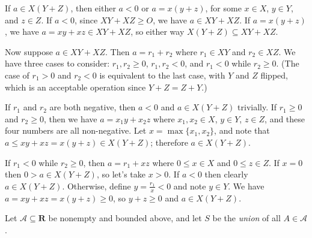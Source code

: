 \begin{solution}
{\item If \(a \in X(Y+Z)\), then either \(a < 0\) or \(a = x(y+z)\), for some \(x \in X\), \(y \in Y\), and \(z \in Z\). If \(a < 0\), since \(XY + XZ \geq O\), we have \(a \in XY + XZ\). If \(a = x(y+z)\), we have \(a = xy + xz \in XY + XZ\), so either way \(X(Y+Z) \subseteq XY + XZ\).

Now suppose \(a \in XY + XZ\). Then \(a = r_1 + r_2\) where \(r_1 \in XY\) and \(r_2 \in XZ\). We have three cases to consider: \(r_1,r_2 \geq 0\), \(r_1,r_2 < 0\), and \(r_1 < 0\) while \(r_2 \geq 0\). (The case of \(r_1 > 0\) and \(r_2 < 0\) is equivalent to the last case, with \(Y\) and \(Z\) flipped, which is an acceptable operation since \(Y+Z = Z+Y\).)

If \(r_1\) and \(r_2\) are both negative, then \(a < 0\) and \(a \in X(Y+Z)\) trivially. If \(r_1 \geq 0\) and \(r_2 \geq 0\), then we have \(a =x_1 y + x_2 z\) where \(x_1, x_2 \in X\), \(y\in Y\), \(z \in Z\), and these four numbers are all non-negative. Let \(x = \max\{x_1, x_2\}\), and note that \(a \leq xy + xz = x(y+z) \in X(Y+Z)\); therefore \(a \in X(Y+Z)\).

If \(r_1 < 0\) while \(r_2 \geq 0\), then \(a = r_1 + xz\) where \(0 \leq x \in X\) and \(0 \leq z \in Z\). If \(x = 0\)  then \(0 > a \in X(Y+Z)\), so let's take \(x > 0\).
If \(a < 0\) then clearly \(a \in X(Y+Z)\). Otherwise, define \(y = \frac{r_1}{x} < 0 \) and note \(y \in Y\). We have \(a = xy + xz = x(y+z) \geq 0\), so \(y+z \geq 0\) and \(a \in X(Y+Z)\).
}
\end{solution}

\begin{exercise}
 Let \(\mathcal{A} \subseteq \mathbf{R}\) be nonempty and bounded above, and let \(S\) be the \emph{union} of all \(A \in \mathcal{A}\).
\end{exercise}
\begin{solution}
\end{solution}

